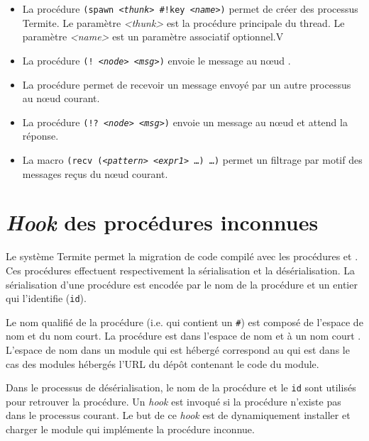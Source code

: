 \begin{itemize}
  \item La procédure \texttt{(spawn \textit{<thunk>} \#!key \textit{<name>})} permet de
    créer des processus Termite. Le paramètre \textit{<thunk>} est la procédure principale
    du thread. Le paramètre \textit{<name>} est un paramètre associatif optionnel.V

  \item La procédure \texttt{(! \textit{<node>} \textit{<msg>})} envoie le message
     au nœud .

  \item La procédure  permet de recevoir un message
    envoyé par un autre processus au nœud courant.

  \item La procédure \texttt{(!? \textit{<node>} \textit{<msg>})} envoie un message au
    nœud  et attend la réponse.

  \item La macro \texttt{(recv (\textit{<pattern>} \textit{<expr1>} \dots) \dots)}
    permet un filtrage par motif des messages reçus du nœud courant.

\end{itemize}

\section{\textit{Hook} des procédures inconnues}
%
Le système Termite permet la migration de code compilé avec les procédures
 et . Ces procédures
effectuent respectivement la sérialisation et la désérialisation.
La sérialisation d'une procédure est encodée par le nom de la procédure et
un entier qui l'identifie (\texttt{id}).

Le nom qualifié de la procédure (i.e. qui contient un \texttt{\#}) est composé
de l'espace de nom et du nom court. La procédure  est
dans l'espace de nom  et à un nom court .
L'espace de nom dans un module qui est hébergé correspond au 
qui est dans le cas des modules hébergés l'URL du dépôt contenant
le code du module.

Dans le processus de désérialisation, le nom de la procédure et le \texttt{id}
sont utilisés pour retrouver la procédure. Un \textit{hook} est invoqué
si la procédure n'existe pas dans le processus courant. Le but de
ce \textit{hook} est de dynamiquement installer et charger le module 
qui implémente la procédure inconnue.

